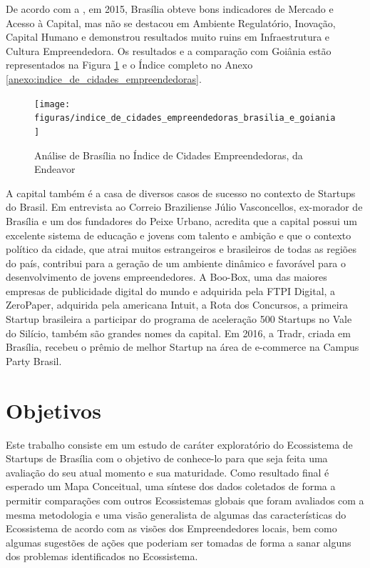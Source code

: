De acordo com a , em 2015, Brasília obteve bons indicadores de Mercado e Acesso à Capital, mas não se destacou em Ambiente Regulatório, Inovação, Capital Humano e demonstrou resultados muito ruins em Infraestrutura e Cultura Empreendedora. Os resultados e a comparação com Goiânia estão representados na Figura \ref{figure:indice_de_cidades_empreendedoras_brasilia_e_goiania} e o Índice completo no Anexo \ref{anexo:indice_de_cidades_empreendedoras}.

\begin{figure}[!htb] 
\centering
\texttt{[image: figuras/indice\_de\_cidades\_empreendedoras\_brasilia\_e\_goiania]}
\caption{Análise de Brasília no Índice de Cidades Empreendedoras, da Endeavor}
\label{figure:indice_de_cidades_empreendedoras_brasilia_e_goiania}
\end{figure}

A capital também é a casa de diversos casos de sucesso no contexto de Startups do Brasil. Em entrevista ao Correio Braziliense Júlio Vasconcellos, ex-morador de Brasília e um dos fundadores do Peixe Urbano, acredita que a capital possui um excelente sistema de educação e jovens com talento e ambição e que o contexto político da cidade, que atrai muitos estrangeiros e brasileiros de todas as regiões do país, contribui para a geração de um ambiente dinâmico e favorável para o desenvolvimento de jovens empreendedores. A Boo-Box, uma das maiores empresas de publicidade digital do mundo e adquirida pela FTPI Digital, a ZeroPaper, adquirida pela americana Intuit, a Rota dos Concursos, a primeira Startup brasileira a participar do programa de aceleração 500 Startups no Vale do Silício, também são grandes nomes da capital. Em 2016, a Tradr, criada em Brasília, recebeu o prêmio de melhor Startup na área de e-commerce na Campus Party Brasil.

\section{Objetivos}
\label{section:objetivos}

Este trabalho consiste em um estudo de caráter exploratório do Ecossistema de Startups de Brasília com o objetivo de conhece-lo para que seja feita uma avaliação do seu atual momento e sua maturidade. Como resultado final é esperado um Mapa Conceitual, uma síntese dos dados coletados de forma a permitir comparações com outros Ecossistemas globais que foram avaliados com a mesma metodologia e uma visão generalista de algumas das características do Ecossistema de acordo com as visões dos Empreendedores locais, bem como algumas sugestões de ações que poderiam ser tomadas de forma a sanar alguns dos problemas identificados no Ecossistema.

